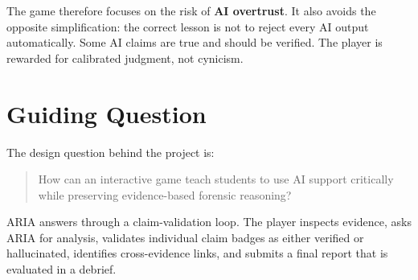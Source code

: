 The game therefore focuses on the risk of \textbf{AI overtrust}. It also avoids the opposite simplification: the correct lesson is not to reject every AI output automatically. Some AI claims are true and should be verified. The player is rewarded for calibrated judgment, not cynicism.

\section{Guiding Question}

The design question behind the project is:

\begin{quote}
How can an interactive game teach students to use AI support critically while preserving evidence-based forensic reasoning?
\end{quote}

ARIA answers through a claim-validation loop. The player inspects evidence, asks ARIA for analysis, validates individual claim badges as either verified or hallucinated, identifies cross-evidence links, and submits a final report that is evaluated in a debrief.
